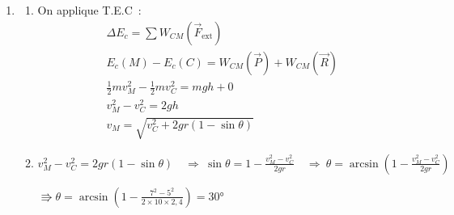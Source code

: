 \begin{enumerate}
\begin{enumerate}
                    $\Rightarrow W_{AB}(\vec{f})=-120 \times 8=
                    \qty{-960}{\N}$ \hfill\textbf{(0,5pt)}

              \item On applique T.E.C~:
                    \begin{gather*}
                        \Delta E_{c}=\sum W_{BC}(\vec{F}_{\text{ext}}) \\
                        E_{c}(C)-E_{c}(B)=W_{BC}(\vec{P})+W_{BC}(\vec{R})+
                        W_{BC}(\vec{R}_{N})
                        \tag{0,5pt} \\
                        \frac{1}{2}m v_{C}^{2}-\frac{1}{2}m v_{B}^{2}=
                        0+0+W_{BC}(\vec{f}) \\
                        v_{C}^{2}-v_{B}^{2}=\frac{2 W_{BC}(\vec{f})}{m} \\
                        v_{C}=\sqrt{v_{B}^{2}+\frac{2 W_{BC}(\vec{f})}{m}}
                        \tag{0,5pt} \\
                        v_{B}=\sqrt{7+\frac{2\times(-960)}{80}}=\qty{5}{\m\per\s}
                        \tag{0,5pt}
                    \end{gather*}
          \end{enumerate}
    \item
          \begin{enumerate}
              \item On applique T.E.C~:
                    \begin{gather*}
                        \Delta E_{c}=\sum W_{CM}(\vec{F}_{\text{ext}}) \\
                        E_{c}(M)-E_{c}(C)=W_{CM}(\vec{P})+W_{CM}(\vec{R})
                        \tag{0,5pt} \\
                        \frac{1}{2}m v_{M}^{2}-\frac{1}{2}m v_{C}^{2}=mgh+0 \\
                        v_{M}^{2}-v_{C}^{2}=2gh \\
                        v_{M}=\sqrt{v_{C}^{2}+2gr(1-\sin\theta)}
                        \tag{0,5pt}
                    \end{gather*}
              \item $v_{M}^{2}-v_{C}^{2}=2gr(1-\sin\theta)
                    \quad\Rightarrow\
                    \sin\theta=1-\frac{v_{M}^{2}-v_{C}^{2}}{2gr}
                    \quad\Rightarrow\
                    \theta=\arcsin\left(1-\frac{v_{M}^{2}-
                    v_{C}^{2}}{2gr}\right)$

                    $\Rrightarrow\theta=\arcsin\left(1-
                    \frac{7^{2}-5^{2}}{2\times10\times2,4}\right)=\ang{30}$
          \end{enumerate}
\end{enumerate}
